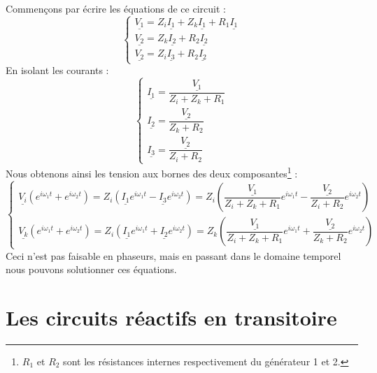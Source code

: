 \documentclass	[11pt, a4paper, openany]{book}
\begin{document}
Commençons par écrire les équations de ce circuit : 
\begin{equation}
\left\{\begin{array}{l}
\underline{V_1} = Z_i\underline{I_1} + Z_k\underline{I_1} + R_1\underline{I_1}\\
\underline{V_2} = Z_k \underline{I_2} + R_2\underline{I_2}\\
\underline{V_2} = Z_i \underline{I_3} + R_2\underline{I_2}
\end{array}\right.
\end{equation}
En isolant les courants :
\begin{equation}
\left\{\begin{array}{l}
\underline{I_1} = \dfrac{\underline{V_1}}{Z_i + Z_k + R_1}\\
\underline{I_2} = \dfrac{\underline{V_2}}{Z_k + R_2}\\
\underline{I_3} = \dfrac{\underline{V_2}}{Z_i + R_2}
\end{array}\right.
\end{equation}
Nous obtenons ainsi les tension aux bornes des deux composantes\footnote{$R_1$ et $R_2$ sont les résistances internes respectivement du générateur 1 et 2.} :
\begin{equation}
\left\{\begin{array}{l}
\underline{V_i}(e^{i\omega_1t}+e^{i\omega_2t}) = Z_i(\underline{I_1}e^{i\omega_1t} - \underline{I_3}e^{i\omega_2t}) = Z_i\left(\dfrac{\underline{V_1}}{Z_i+Z_k + R_1}e^{i\omega_1t}-\dfrac{\underline{V_2}}{Z_i + R_2}e^{i\omega_2t}\right)\\
\underline{V_k}(e^{i\omega_1t}+e^{i\omega_2t}) = Z_i(\underline{I_1}e^{i\omega_1t} + \underline{I_2}e^{i\omega_2t}) = Z_k\left(\dfrac{\underline{V_1}}{Z_i+Z_k + R_1}e^{i\omega_1t}+\dfrac{\underline{V_2}}{Z_k + R_2}e^{i\omega_2t}\right)
\end{array}\right.
\end{equation}
Ceci n'est pas faisable en phaseurs, mais en passant dans le domaine temporel nous pouvons solutionner ces équations.
















\chapter{Les circuits réactifs en transitoire}
\end{document}

